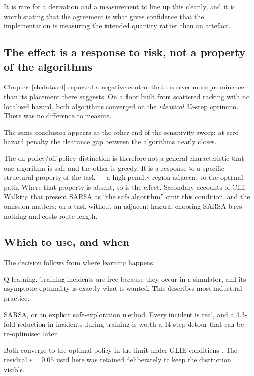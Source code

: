 It is rare for a derivation and a measurement to line up this cleanly, and it is worth stating that
the agreement is what gives confidence that the implementation is measuring the intended quantity
rather than an artefact.

\subsection{The effect is a response to risk, not a property of the algorithms}

Chapter~\ref{ch:dataset} reported a negative control that deserves more prominence than its
placement there suggests. On a floor built from scattered racking with no localised hazard, both
algorithms converged on the \emph{identical} 39-step optimum. There was no difference to measure.

The same conclusion appears at the other end of the sensitivity sweep: at zero hazard penalty the
clearance gap between the algorithms nearly closes.

The on-policy/off-policy distinction is therefore not a general characteristic that one algorithm
is safe and the other is greedy. It is a response to a specific structural property of the task ---
a high-penalty region adjacent to the optimal path. Where that property is absent, so is the
effect. Secondary accounts of Cliff Walking that present SARSA as ``the safe algorithm'' omit this
condition, and the omission matters: on a task without an adjacent hazard, choosing SARSA buys
nothing and costs route length.

\subsection{Which to use, and when}

The decision follows from where learning happens.

 Q-learning. Training incidents are free
because they occur in a simulator, and its asymptotic optimality is exactly what is wanted. This
describes most industrial practice.

 SARSA, or an explicit safe-exploration method.
Every incident is real, and a 4.3-fold reduction in incidents during training is worth a 14-step
detour that can be re-optimised later.

 Both converge to the optimal policy in
the limit under GLIE conditions \cite{singh2000}. The residual $\varepsilon = 0.05$ used here was
retained deliberately to keep the distinction visible.

